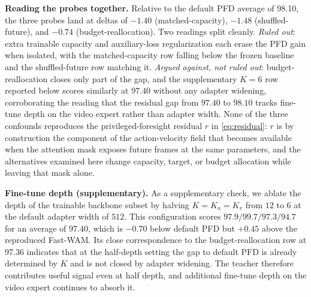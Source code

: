 \documentclass{article}
\begin{document}
\noindent\textbf{Reading the probes together.} Relative to the default PFD average of 98.10, the three probes land at deltas of $-1.40$ (matched-capacity), $-1.48$ (shuffled-future), and $-0.74$ (budget-reallocation). Two readings split cleanly. \emph{Ruled out}: extra trainable capacity and auxiliary-loss regularization each erase the PFD gain when isolated, with the matched-capacity row falling below the frozen baseline and the shuffled-future row matching it. \emph{Argued against, not ruled out}: budget-reallocation closes only part of the gap, and the supplementary $K = 6$ row reported below scores similarly at $97.40$ without any adapter widening, corroborating the reading that the residual gap from $97.40$ to $98.10$ tracks fine-tune depth on the video expert rather than adapter width. None of the three confounds reproduces the privileged-foresight residual $r$ in \eqref{eq:residual}: $r$ is by construction the component of the action-velocity field that becomes available when the attention mask exposes future frames at the same parameters, and the alternatives examined here change capacity, target, or budget allocation while leaving that mask alone.

\noindent\textbf{Fine-tune depth (supplementary).} As a supplementary check, we ablate the depth of the trainable backbone subset by halving $K = K_a = K_v$ from $12$ to $6$ at the default adapter width of $512$. This configuration scores $97.9 / 99.7 / 97.3 / 94.7$ for an average of $97.40$, which is $-0.70$ below default PFD but $+0.45$ above the reproduced Fast-WAM. Its close correspondence to the budget-reallocation row at 97.36 indicates that at the half-depth setting the gap to default PFD is already determined by $K$ and is not closed by adapter widening. The teacher therefore contributes useful signal even at half depth, and additional fine-tune depth on the video expert continues to absorb it.
\end{document}
